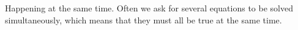 Happening at the same time. Often we ask for several 
equations to be solved simultaneously, which means
that they must all be true at the same time.